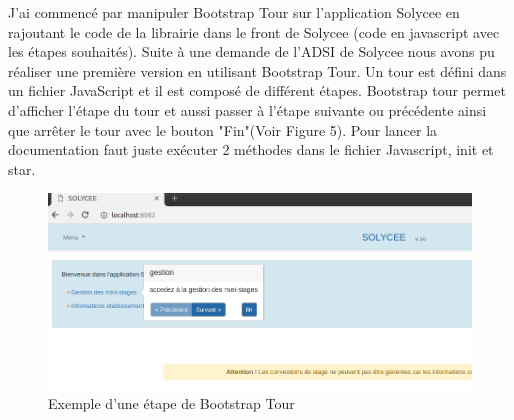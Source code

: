 \documentclass[12pt]{article}
\begin{document}
J'ai commencé par manipuler Bootstrap Tour sur l'application Solycee en rajoutant le code de la librairie dans le front de Solycee (code en javascript avec les étapes souhaités). Suite à une demande de l'ADSI de Solycee nous avons pu réaliser une première version en utilisant Bootstrap Tour. Un tour est défini dans un fichier JavaScript et il est composé de différent étapes. Bootstrap tour permet d'afficher l'étape du tour et aussi passer à l'étape suivante ou précédente ainsi que arrêter le tour avec le bouton "Fin"(Voir Figure 5). Pour lancer la documentation faut juste exécuter  2 méthodes dans le fichier Javascript, init et star. 
\begin{figure}[H]
	\centering
 		\includegraphics[width=1\textwidth]{diagrammes/exemple_Tour.png} 
  		\caption{Exemple d'une étape de Bootstrap Tour}
	\end{figure}
\end{document}
